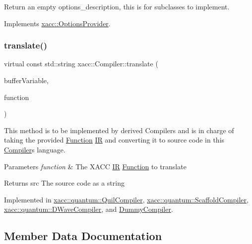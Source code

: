 Return an empty options\+\_\+description, this is for subclasses to implement. 

Implements \hyperlink{a01543_a6d150954f852109bfe2c1ae90222926f}{xacc\+::\+Options\+Provider}.

\mbox{\label{a01451_aeedbe58a33fed29e4d7694ae743e25e7}} 
\subsubsection{\texorpdfstring{translate()}{translate()}}
{\footnotesize\ttfamily virtual const std\+::string xacc\+::\+Compiler\+::translate (\begin{DoxyParamCaption}\item[{const std\+::string \&}]{buffer\+Variable,  }\item[{std\+::shared\+\_\+ptr$<$ \hyperlink{a01475}{Function} $>$}]{function }\end{DoxyParamCaption})\hspace{0.3cm}{\ttfamily [pure virtual]}}

This method is to be implemented by derived Compilers and is in charge of taking the provided \hyperlink{a01475}{Function} \hyperlink{a01499}{IR} and converting it to source code in this \hyperlink{a01451}{Compiler}\textquotesingle{}s language.


\begin{DoxyParams}{Parameters}
{\em function} & The X\+A\+CC \hyperlink{a01499}{IR} \hyperlink{a01475}{Function} to translate \\
\hline
\end{DoxyParams}
\begin{DoxyReturn}{Returns}
src The source code as a string 
\end{DoxyReturn}


Implemented in \hyperlink{a01075_a66ca00bbb1f30e7bc6dd86b1e267b93b}{xacc\+::quantum\+::\+Quil\+Compiler}, \hyperlink{a01103_ac7ca2941e987ba579c6f50cfbd7fb0dc}{xacc\+::quantum\+::\+Scaffold\+Compiler}, \hyperlink{a01115_a73a8839c55d22c68e5264feca8d626d4}{xacc\+::quantum\+::\+D\+Wave\+Compiler}, and \hyperlink{a01139_a606c27150c8d374242b8824e45b1e0c1}{Dummy\+Compiler}.



\subsection{Member Data Documentation}
\mbox{\label{a01451_ad4cbb467fa7e377bac6c054ffcb22b7c}} 
